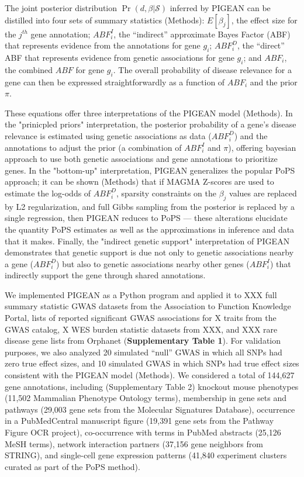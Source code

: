 \documentclass[sn-nature,lineno]{sn-jnl}%
\theoremstyle{thmstyleone}%
\theoremstyle{thmstyletwo}%
\theoremstyle{thmstylethree}%
\begin{document}
The joint posterior distribution $\Pr(d,\beta|\mathcal{S})$ inferred by PIGEAN can be distilled into four sets of summary statistics (Methods): $E[\beta_j]$, the effect size for the $j^{th}$  gene annotation; $ABF^I_i$, the “indirect” approximate Bayes Factor (ABF) that represents evidence from the annotations for gene $g_i$; $ABF^D_i$, the “direct” ABF that represents evidence from genetic associations for gene $g_i$; and $ABF_i$, the combined $ABF$ for gene $g_i$. The overall probability of disease relevance for a gene can then be expressed straightforwardly as a function of $ABF_i$ and the prior $\pi$. 

These equations offer three interpretations of the PIGEAN model (Methods). In the "prinicpled priors" interpretation, the posterior probability of a gene's disease relevance is estimated using genetic associations as data ($ABF_i^D$) and the annotations to adjust the prior (a combination of $ABF_i^I$ and $\pi$), offering bayesian approach to use both genetic associations and gene annotations to prioritize genes. In the "bottom-up" interpretation, PIGEAN generalizes the popular PoPS approach; it can be shown (Methods) that if MAGMA Z-scores are used to estimate the log-odds of $ABF_i^D$, sparsity constraints on the $\beta_j$ values are replaced by L2 regularization, and full Gibbs sampling from the posterior is replaced by a single regression, then PIGEAN reduces to PoPS --- these alterations elucidate the quantity PoPS  estimates as well as the approximations in inference and data that it makes. Finally, the "indirect genetic support" interpretation of PIGEAN demonstrates that genetic support is due not only to genetic associations nearby a gene ($ABF_i^D$) but also to genetic associations nearby other genes ($ABF_i^I$) that indirectly support the gene through shared annotations.

We implemented PIGEAN as a Python program and applied it to XXX full summary statistic GWAS datasets from the Association to Function Knowledge Portal, lists of reported significant GWAS associations for X traits from the GWAS catalog, X WES burden statistic datasets from XXX, and XXX rare disease gene lists from Orphanet (\textbf{Supplementary Table 1}). For validation purposes, we also analyzed 20 simulated “null” GWAS in which all SNPs had zero true effect sizes, and 10 simulated GWAS in which SNPs had true effect sizes consistent with the PIGEAN model (Methods). We considered a total of 144,627 gene annotations, including (Supplementary Table 2) knockout mouse phenotypes (11,502 Mammalian Phenotype Ontology terms), membership in gene sets and pathways (29,003 gene sets from the Molecular Signatures Database), occurrence in a PubMedCentral manuscript figure (19,391 gene sets from the Pathway Figure OCR project), co-occurrence with terms in PubMed abstracts (25,126 MeSH terms), network interaction partners (37,156 gene neighbors from STRING), and single-cell gene expression patterns (41,840 experiment clusters curated as part of the PoPS method).
\end{document}
